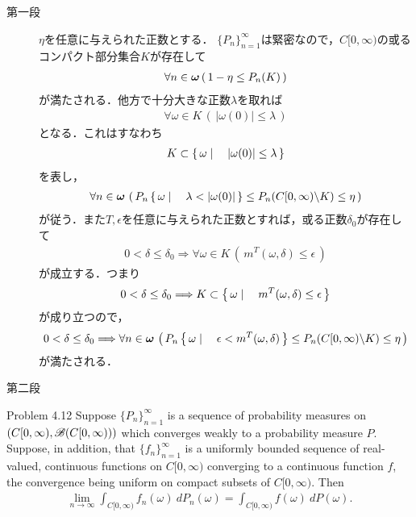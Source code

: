 	\begin{sketch}\mbox{}
		\begin{description}
			\item[第一段]
				$\eta$を任意に与えられた正数とする．
				$\{P_n\}_{n=1}^\infty$は緊密なので，$C[0,\infty)$の或るコンパクト部分集合$K$が存在して
				\begin{align}
					\forall n \in {\boldsymbol \omega}\, (\, 1 - \eta \leq P_n(K)\, )
				\end{align}
				が満たされる．他方で十分大きな正数$\lambda$を取れば
				\begin{align}
					\forall \omega \in K\, (\, |\omega(0)| \leq \lambda\, )
				\end{align}
				となる．これはすなわち
				\begin{align}
					K \subset \left\{\, \omega \mid \quad |\omega(0)| \leq \lambda\, \right\}
				\end{align}
				を表し，
				\begin{align}
					\forall n \in {\boldsymbol \omega}\, \left(\, P_n\left\{\, \omega \mid \quad \lambda < |\omega(0)|\, \right\}
					\leq P_n(C[0,\infty) \backslash K) \leq \eta\, \right)
				\end{align}
				が従う．また$T,\epsilon$を任意に与えられた正数とすれば，或る正数$\delta_0$が存在して
				\begin{align}
					0 < \delta \leq \delta_0
					\Longrightarrow \forall \omega \in K\, \left(\, m^T(\omega,\delta) \leq \epsilon\, \right)
				\end{align}
				が成立する．つまり
				\begin{align}
					0 < \delta \leq \delta_0
					\Longrightarrow K \subset \left\{\, \omega \mid \quad m^T(\omega,\delta) \leq \epsilon\, \right\}
				\end{align}
				が成り立つので，
				\begin{align}
					0 < \delta \leq \delta_0
					\Longrightarrow \forall n \in {\boldsymbol \omega}\, \left(\, P_n\left\{\, \omega \mid \quad \epsilon < m^T(\omega,\delta)\, \right\}
					\leq P_n(C[0,\infty) \backslash K) \leq \eta\, \right)
				\end{align}
				が満たされる．
				
			\item[第二段]
		\end{description}
	\end{sketch}
	
	\begin{itembox}[l]{Problem 4.12}
		Suppose $\{P_n\}_{n=1}^\infty$ is a sequence of probability measures on
		$\left( C[0,\infty),\mathscr{B}(C[0,\infty)) \right)$ which converges weakly to a probability
		measure $P$. Suppose, in addition, that $\{f_n\}_{n=1}^\infty$ is a uniformly bounded sequence
		of real-valued, continuous functions on $C[0,\infty)$ converging to a continuous function $f$,
		the convergence being uniform on compact subsets of $C[0,\infty)$. Then
		\begin{align}
			\lim_{n \to \infty} \int_{C[0,\infty)} f_n(\omega)\ dP_n(\omega)
			= \int_{C[0,\infty)} f(\omega)\ dP(\omega).
		\end{align}
	\end{itembox}
	
